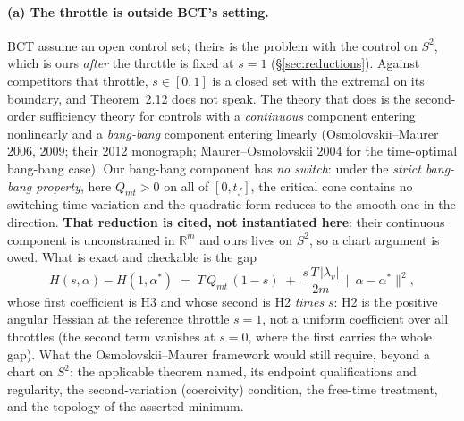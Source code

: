 \documentclass[11pt]{article}
\theoremstyle{definition}
\newcommand{\lv}{\lambda_v}
\newcommand{\tf}{t_f}
\begin{document}
\paragraph{(a) The throttle is outside BCT's setting.}
BCT assume an open control set; theirs is the problem with the control on
$S^2$, which is ours \emph{after} the throttle is fixed at $s=1$
(\S\ref{sec:reductions}). Against competitors that throttle, $s\in[0,1]$ is a
closed set with the extremal on its boundary, and Theorem~2.12 does not speak.
The theory that does is the second-order sufficiency theory for controls with a
\emph{continuous} component entering nonlinearly and a \emph{bang-bang}
component entering linearly (Osmolovskii--Maurer 2006, 2009; their 2012
monograph; Maurer--Osmolovskii 2004 for the time-optimal bang-bang case). Our
bang-bang component has \emph{no switch}: under the \emph{strict bang-bang
property}, here $Q_{mt}>0$ on all of $[0,\tf]$, the critical cone contains no
switching-time variation and the quadratic form reduces to the smooth one in
the direction. \textbf{That reduction is cited, not instantiated here}: their
continuous component is unconstrained in $\mathbb{R}^m$ and ours lives on
$S^2$, so a chart argument is owed. What is exact and checkable is the gap
\[
 H(s,\alpha)-H(1,\alpha^{*})\;=\;T\,Q_{mt}\,(1-s)\;+\;\frac{s\,T\,|\lv|}{2m}\,\|\alpha-\alpha^{*}\|^{2},
\]
whose first coefficient is H3 and whose second is H2 \emph{times} $s$: H2 is
the positive angular Hessian at the reference throttle $s=1$, not a uniform
coefficient over all throttles (the second term vanishes at $s=0$, where the
first carries the whole gap). What the Osmolovskii--Maurer framework would
still require, beyond a chart on $S^2$: the applicable theorem named, its
endpoint qualifications and regularity, the second-variation (coercivity)
condition, the free-time treatment, and the topology of the asserted minimum.
\end{document}
